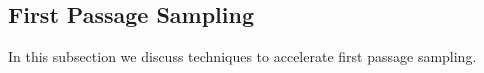 \documentclass[a4paper,12pt]{article}
\begin{document}




\subsection{First Passage Sampling}

In this subsection we discuss techniques to accelerate first passage sampling.
\end{document}
